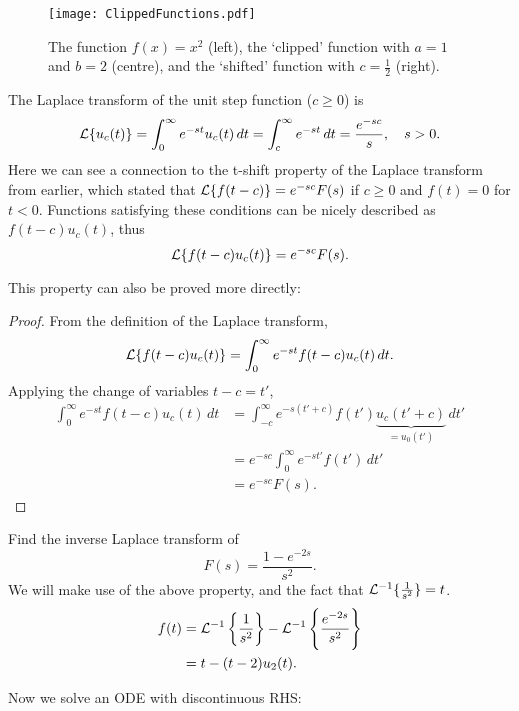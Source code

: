 \begin{figure}[!ht]
	\centering
	\texttt{[image: ClippedFunctions.pdf]}
	\caption{The function $f(x)=x^2$ (left), the `clipped' function with $a=1$ and $b=2$ (centre), and the `shifted' function with $c=\frac12$ (right).}
	\label{fig:clipping}
\end{figure}

The Laplace transform of the unit step function ($c \geq 0$) is
\[
	\mathcal{L}\{u_c(t)\} = \int_0^{\infty} e^{-st}u_c(t)\,dt = \int_c^{\infty}e^{-st}\,dt = \frac{e^{-sc}}{s}, \quad s>0.
\]
Here we can see a connection to the t-shift property of the Laplace transform from earlier, which stated that $\mathcal{L}\{f(t-c)\} = e^{-sc}F(s)$ if $c \geq 0$ and $f(t)=0$ for $t<0$. Functions satisfying these conditions can be nicely described as $f(t-c)u_c(t)$, thus
\begin{equation}\label{eq:laplacediscont}
	\mathcal{L}\{f(t-c)u_c(t)\} = e^{-sc}F(s).
\end{equation}

This property can also be proved more directly:
\begin{proof}
	From the definition of the Laplace transform,
	\[
	\mathcal{L}\{f(t-c)u_c(t)\} = \int_0^{\infty} e^{-st}f(t-c)u_c(t) \,dt.
	\]
	Applying the change of variables $t-c=t'$,
	\begin{align*}
		\int_0^{\infty} e^{-st}f(t-c)u_c(t) \,dt &= \int_{-c}^{\infty} e^{-s(t'+c)}f(t') \underbrace{u_c(t'+c)}_{=u_0(t')} \,dt' \\
		&= e^{-sc} \int_0^{\infty} e^{-st'}f(t') \,dt' \\
		&= e^{-sc} F(s).
	\end{align*}
\end{proof}

\begin{eg}
	Find the inverse Laplace transform of 
	\[
	F(s) = \frac{1-e^{-2s}}{s^2}.
	\]
	We will make use of the above property, and the fact that $\mathcal{L}^{-1}\{\frac{1}{s^2}\} = t$.
	\begin{align*}
		f(t) &= \mathcal{L}^{-1}\left\{\frac{1}{s^2}\right\} - \mathcal{L}^{-1}\left\{\frac{e^{-2s}}{s^2}\right\} \\
		&= t - (t-2)u_2(t).
	\end{align*}
\end{eg}

Now we solve an ODE with discontinuous RHS:

